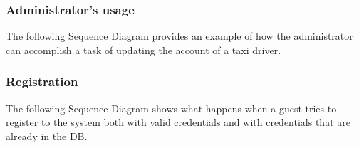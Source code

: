 \documentclass{article}
\begin{document}
\subsubsection{Administrator's usage}
The following Sequence Diagram provides an example of how the administrator can accomplish a task of updating the account of a taxi driver.
\begin{figure}[H]
\end{figure}
\subsubsection{Registration}
The following Sequence Diagram shows what happens when a guest tries to register to the system both with valid credentials and with credentials that are already in the DB\@.
\begin{figure}[H]
\end{figure}
\end{document}
